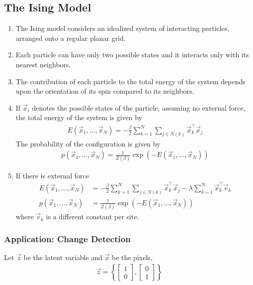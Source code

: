 \documentclass[12pt,twoside]{article}
\begin{document}
\subsection{The Ising Model}
\begin{enumerate}
	\item The Ising model considers an idealized system of interacting particles, arranged onto a regular planar grid.
	\item Each particle can have only two possible states and it interacts only with its nearest neighbors.
	\item The contribution of each particle to the total energy of the system depends upon the orientation of its spin compared to its neighbors.
	\item If $\vec{x}_i$ denotes the possible states of the particle, assuming no external force, the total energy of the system is given by
		\begin{align*}
			E(\vec{x}_1, \ldots, \vec{x}_N) = -\frac{\beta}{2} \sum_{k=1}^N \sum_{j\in N(k)} \vec{x}_k^\top \vec{x}_j
		\end{align*}			
	The probability of the configuration is given by
		\begin{align*}
			p(\vec{x}_1, \ldots, \vec{x}_N) = \frac{1}{Z(\beta)}\exp\left(-E(\vec{x}_1, \ldots, \vec{x}_N)\right)
		\end{align*}			
	
	\item If there is external force
		\begin{align*}
			E(\vec{x}_1,\ldots, \vec{x}_N) &=  -\frac{\beta}{2} \sum_{k=1}^N \sum_{j\in N(k)}  \vec{x}_k^\top \vec{x}_j - \lambda \sum_{k=1}^N \vec{x}_k^\top \vec{v}_k\\
			p(\vec{x}_1, \ldots, \vec{x}_N) &= \frac{1}{Z(\beta)}\exp\left(-E(\vec{x}_1, \ldots, \vec{x}_N)\right)			
		\end{align*}
	where $\vec{v}_k$ is a different constant per site.
	
\end{enumerate}



\subsubsection{Application: Change Detection}

Let $\vec{z}$ be the latent variable and $\vec{x}$ be the pixels,
\begin{align*}
	\vec{z} = \left\lbrace 
	\begin{bmatrix}
	1 \\
	0
	\end{bmatrix}
	,
		\begin{bmatrix}
	0\\
	1
	\end{bmatrix}				
	\right\rbrace
\end{align*}
\end{document}
